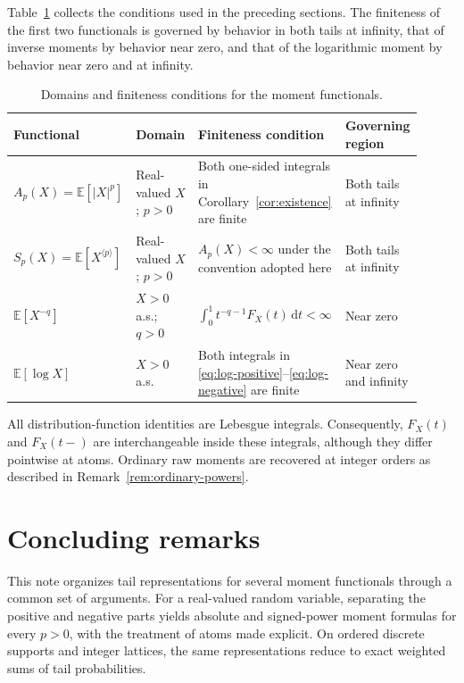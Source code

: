 \documentclass[11pt]{article}
\theoremstyle{definition}
\theoremstyle{remark}
\newcommand{\E}{\mathbb{E}}
\newcommand{\dd}{\,\mathrm{d}}
\newcommand{\abs}[1]{\left\lvert #1\right\rvert}
\newcommand{\spow}[2]{#1^{\langle #2\rangle}}
\begin{document}
Table~\ref{tab:summary} collects the conditions used in the preceding
sections.  The finiteness of the first two functionals is governed by
behavior in both tails at infinity, that of inverse moments by behavior near
zero, and that of the logarithmic moment by behavior near zero and at
infinity.

\begin{table}[ht]
\centering
\caption{Domains and finiteness conditions for the moment functionals.}
\label{tab:summary}
\small
\begin{tabular}{@{}>{\raggedright\arraybackslash}p{0.18\linewidth}
                  >{\raggedright\arraybackslash}p{0.17\linewidth}
                  >{\raggedright\arraybackslash}p{0.39\linewidth}
                  >{\raggedright\arraybackslash}p{0.17\linewidth}@{}}
\toprule
Functional & Domain & Finiteness condition & Governing region \\
\midrule
$A_p(X)=\E[\abs X^p]$
  & Real-valued $X$; $p>0$
  & Both one-sided integrals in Corollary~\ref{cor:existence} are finite
  & Both tails at infinity \\
$S_p(X)=\E[\spow{X}{p}]$
  & Real-valued $X$; $p>0$
  & $A_p(X)<\infty$ under the convention adopted here
  & Both tails at infinity \\
$\E[X^{-q}]$
  & $X>0$ a.s.; $q>0$
  & $\int_0^1 t^{-q-1}F_X(t)\dd t<\infty$
  & Near zero \\
$\E[\log X]$
  & $X>0$ a.s.
  & Both integrals in \eqref{eq:log-positive}--\eqref{eq:log-negative}
    are finite
  & Near zero and infinity \\
\bottomrule
\end{tabular}
\end{table}

All distribution-function identities are Lebesgue integrals.  Consequently,
$F_X(t)$ and $F_X(t-)$ are interchangeable inside these integrals, although
they differ pointwise at atoms.  Ordinary raw moments are recovered at
integer orders as described in Remark~\ref{rem:ordinary-powers}.

\section{Concluding remarks}

This note organizes tail representations for several moment functionals
through a common set of arguments.  For a real-valued random variable,
separating the positive and negative parts yields absolute and signed-power
moment formulas for every $p>0$, with the treatment of atoms made explicit.
On ordered discrete supports and integer lattices, the same representations
reduce to exact weighted sums of tail probabilities.
\end{document}
